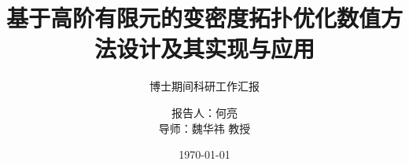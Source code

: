 \documentclass[notheorems]{beamer}
\begin{document}
	
	\title[高阶有限元变密度拓扑优化]{基于高阶有限元的变密度拓扑优化数值方法设计及其实现与应用}
	\subtitle{博士期间科研工作汇报}
	
	\author[何亮]{报告人：何亮 \\
		\vspace{5pt}
		导师：{魏华祎} 教授}
	
	\date{\today}
	
	\frame[plain]{\titlepage}
\end{document}
